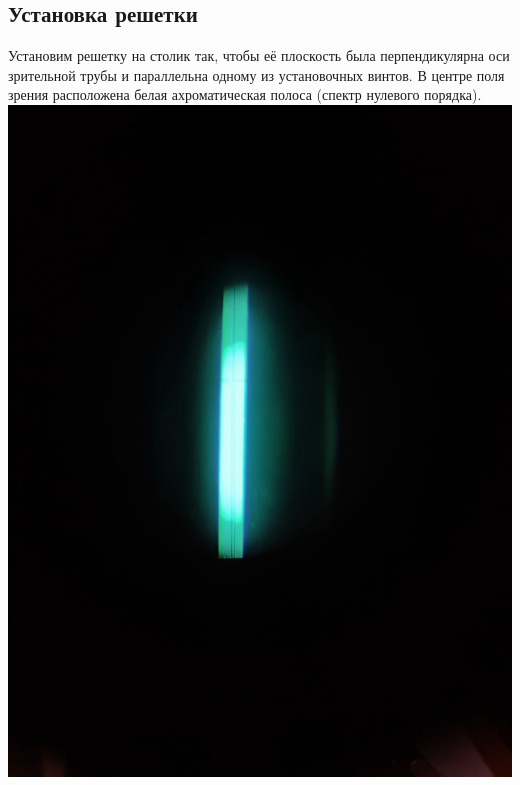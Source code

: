 \documentclass[a4paper]{article}
\begin{document}
\subsection{ Установка решетки}
Установим решетку на столик так, чтобы её плоскость была перпендикулярна оси зрительной трубы и параллельна одному из установочных винтов. В центре поля зрения расположена белая ахроматическая полоса (спектр нулевого порядка). \\
\includegraphics[width=15cm]{p3}\\
\end{document}
